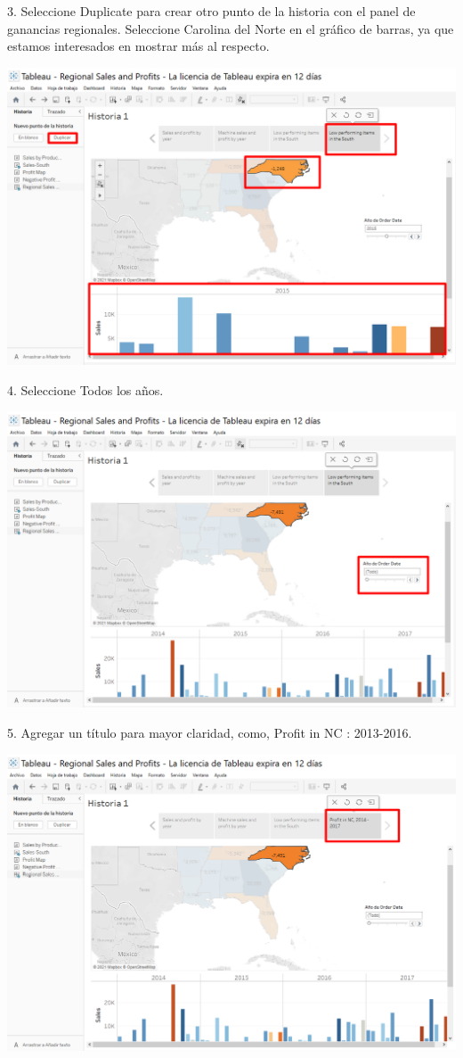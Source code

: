 \documentclass[12pt,letterpaper]{article}
\begin{document}
3. Seleccione Duplicate para crear otro punto de la historia con el panel de ganancias
regionales. Seleccione Carolina del Norte en el gráfico de barras, ya que estamos interesados en
mostrar más al respecto.
\begin{center}
    \includegraphics[width=16cm]{img/67.png}  
\end{center}
4. Seleccione Todos los años.
\begin{center}
    \includegraphics[width=16cm]{img/68.png}  
\end{center}
5. Agregar un título para mayor claridad, como, Profit in NC : 2013-2016.
\begin{center}
    \includegraphics[width=16cm]{img/69.png}  
\end{center}
\end{document}
